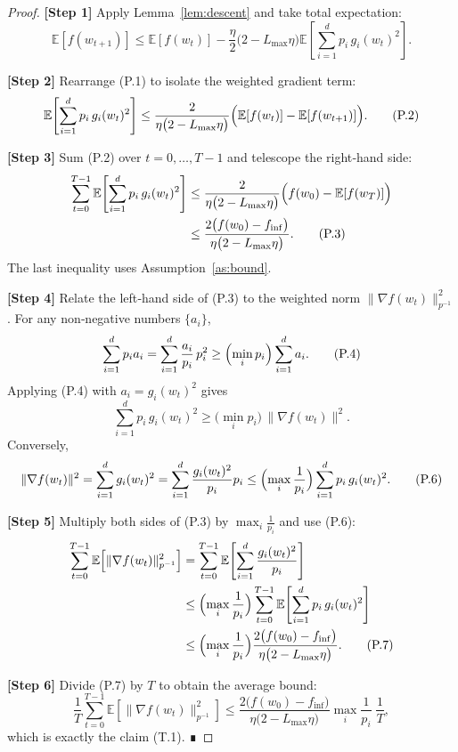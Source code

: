 \documentclass{article}
\newcommand{\EE}{\mathbb{E}}
\begin{document}
\begin{proof}
\noindent\textbf{[Step 1]}  Apply Lemma~\ref{lem:descent} and take total expectation:
\[
\EE\!\left[f(w_{t+1})\right]
\le \EE\!\left[f(w_t)\right]
-\frac{\eta}{2}\bigl(2-L_{\max}\eta\bigr)
\EE\!\left[\sum_{i=1}^{d}p_i\,g_i(w_t)^{2}\right].
\tag{P.1}
\]

\noindent\textbf{[Step 2]}  Rearrange (P.1) to isolate the weighted gradient term:
\[
\EE\!\left[\sum_{i=1}^{d}p_i\,g_i(w_t)^{2}\right]
\le \frac{2}{\eta\bigl(2-L_{\max}\eta\bigr)}
\Bigl(\EE\!\left[f(w_t)\right]-\EE\!\left[f(w_{t+1})\right]\Bigr).
\tag{P.2}
\]

\noindent\textbf{[Step 3]}  Sum (P.2) over $t=0,\dots,T-1$ and telescope the right‑hand side:
\begin{align}
\sum_{t=0}^{T-1}\EE\!\left[\sum_{i=1}^{d}p_i\,g_i(w_t)^{2}\right]
&\le \frac{2}{\eta\bigl(2-L_{\max}\eta\bigr)}
\Bigl(f(w_0)-\EE\!\left[f(w_T)\right]\Bigr) \nonumber\\
&\le \frac{2\bigl(f(w_0)-f_{\inf}\bigr)}{\eta\bigl(2-L_{\max}\eta\bigr)} .
\tag{P.3}
\end{align}
The last inequality uses Assumption~\ref{as:bound}.

\noindent\textbf{[Step 4]}  Relate the left‑hand side of (P.3) to the weighted norm
$\|\nabla f(w_t)\|_{p^{-1}}^{2}$.
For any non‑negative numbers $\{a_i\}$,
\[
\sum_{i=1}^{d}p_i a_i
= \sum_{i=1}^{d}\frac{a_i}{p_i}\,p_i^{2}
\ge \Bigl(\min_{i}p_i\Bigr)\sum_{i=1}^{d}a_i .
\tag{P.4}
\]
Applying (P.4) with $a_i=g_i(w_t)^{2}$ gives
\[
\sum_{i=1}^{d}p_i\,g_i(w_t)^{2}
\ge \bigl(\min_i p_i\bigr)\,\|\nabla f(w_t)\|^{2}.
\tag{P.5}
\]
Conversely,
\[
\|\nabla f(w_t)\|^{2}
= \sum_{i=1}^{d}g_i(w_t)^{2}
= \sum_{i=1}^{d}\frac{g_i(w_t)^{2}}{p_i}p_i
\le \Bigl(\max_i\frac{1}{p_i}\Bigr)
\sum_{i=1}^{d}p_i\,g_i(w_t)^{2}.
\tag{P.6}
\]

\noindent\textbf{[Step 5]}  Multiply both sides of (P.3) by $\max_i\frac{1}{p_i}$ and use (P.6):
\begin{align}
\sum_{t=0}^{T-1}\EE\!\left[\|\nabla f(w_t)\|_{p^{-1}}^{2}\right]
&= \sum_{t=0}^{T-1}\EE\!\left[\sum_{i=1}^{d}\frac{g_i(w_t)^{2}}{p_i}\right] \nonumber\\
&\le \Bigl(\max_{i}\frac{1}{p_i}\Bigr)
\sum_{t=0}^{T-1}\EE\!\left[\sum_{i=1}^{d}p_i\,g_i(w_t)^{2}\right] \nonumber\\
&\le \Bigl(\max_{i}\frac{1}{p_i}\Bigr)
\frac{2\bigl(f(w_0)-f_{\inf}\bigr)}{\eta\bigl(2-L_{\max}\eta\bigr)} .
\tag{P.7}
\end{align}

\noindent\textbf{[Step 6]}  Divide (P.7) by $T$ to obtain the average bound:
\[
\frac{1}{T}\sum_{t=0}^{T-1}\EE\!\left[\|\nabla f(w_t)\|_{p^{-1}}^{2}\right]
\le
\frac{2\bigl(f(w_0)-f_{\inf}\bigr)}{\eta\bigl(2-L_{\max}\eta\bigr)}
\max_{i}\frac{1}{p_i}\;\frac{1}{T},
\]
which is exactly the claim (T.1).  ∎
\end{proof}
\end{document}
